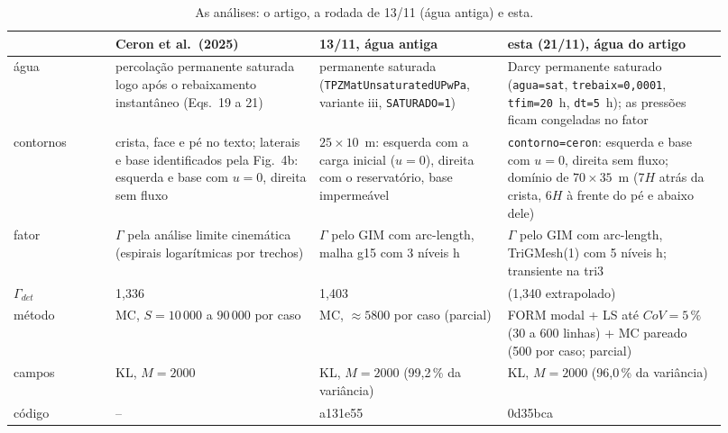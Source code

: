 \documentclass[11pt,a4paper]{article}
\begin{document}
\begin{table}[htbp]\centering\footnotesize\setlength{\tabcolsep}{3pt}
\caption{As análises: o artigo, a rodada de 13/11 (água antiga) e esta.}\label{tab:analises}
\begin{tabular}{p{0.13\linewidth}p{0.26\linewidth}p{0.24\linewidth}p{0.29\linewidth}}\toprule
& Ceron et al.\ (2025) & 13/11, água antiga & esta (21/11), água do artigo \\\midrule
água & percolação permanente saturada logo após o rebaixamento instantâneo (Eqs.~19 a 21) &
  permanente saturada (\texttt{TPZMatUnsaturatedUPwPa}, variante iii, \texttt{SATURADO=1}) &
  Darcy permanente saturado (\texttt{agua=sat}, \texttt{trebaix=0,0001}, \texttt{tfim=20}~h, \texttt{dt=5}~h); as
  pressões ficam congeladas no fator \\
contornos & crista, face e pé no texto; laterais e base identificados pela Fig.~4b: esquerda e base com $u = 0$,
  direita sem fluxo & $25 \times 10$~m: esquerda com a carga inicial ($u = 0$), direita com o reservatório, base
  impermeável & \texttt{contorno=ceron}: esquerda e base com $u = 0$, direita sem fluxo; domínio de $70 \times 35$~m
  (7$H$ atrás da crista, 6$H$ à frente do pé e abaixo dele) \\
fator & $\Gamma$ pela análise limite cinemática (espirais logarítmicas por trechos) & $\Gamma$ pelo GIM com
  arc-length, malha g15 com 3 níveis h & $\Gamma$ pelo GIM com arc-length, TriGMesh(1) com 5 níveis h; transiente
  na tri3 \\
$\Gamma_{det}$ & 1,336 & 1,403 & \gdetRef{} (1,340 extrapolado) \\
método & MC, $S = 10\,000$ a $90\,000$ por caso & MC, $\approx 5800$ por caso (parcial) & FORM modal + LS até
  $CoV = 5\,\%$ (30 a 600 linhas) + MC pareado (500 por caso; parcial) \\
campos & KL, $M = 2000$ & KL, $M = 2000$ (99,2\,\% da variância) & KL, $M = 2000$ (96,0\,\% da variância) \\
código & -- & a131e55 & 0d35bca \\
\bottomrule\end{tabular}\end{table}
\end{document}
